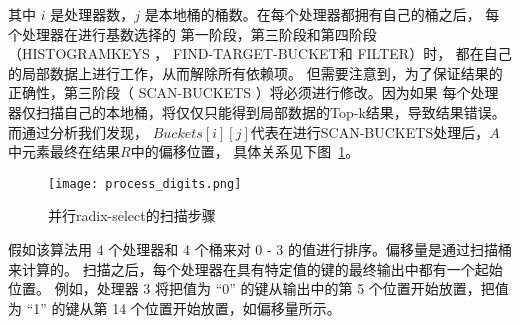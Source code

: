 其中 $i$ 是处理器数，$j$ 是本地桶的桶数。在每个处理器都拥有自己的桶之后，
每个处理器在进行基数选择的
第一阶段，第三阶段和第四阶段（HISTOGRAMKEYS ， FIND-TARGET-BUCKET和 FILTER）时，
都在自己的局部数据上进行工作，从而解除所有依赖项。
但需要注意到，为了保证结果的正确性，第三阶段（ SCAN-BUCKETS ）将必须进行修改。因为如果
每个处理器仅扫描自己的本地桶，将仅仅只能得到局部数据的Top-k结果，导致结果错误。而通过分析我们发现，
$Buckets[i][j]$代表在进行SCAN-BUCKETS处理后，$A$中元素最终在结果$R$中的偏移位置，
具体关系见下图~\ref{fig:digits}。
\begin{figure}[ht]
    \centering
    \texttt{[image: process\_digits.png]}
    \caption{并行radix-select的扫描步骤}
    \label{fig:digits}
\end{figure}

假如该算法用 4 个处理器和 4 个桶来对 0 - 3 的值进行排序。偏移量是通过扫描桶来计算的。
扫描之后，每个处理器在具有特定值的键的最终输出中都有一个起始位置。
例如，处理器 3 将把值为 “0” 的键从输出中的第 5 个位置开始放置，把值为 “1” 的键从第 14 个位置开始放置，如偏移量所示。


